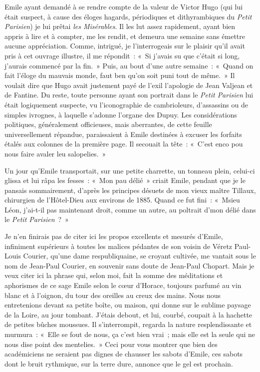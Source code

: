 \documentclass[french,twoside]{book} %
\begin{document}
Emile ayant demandé à se rendre compte de la valeur de Victor Hugo (qui lui était suspect, à cause des éloges hagards, périodiques et dithyrambiques du {\itshape Petit Parisien}) je lui prêtai {\itshape les Misérables}. Il les lut assez rapidement, ayant bien appris à lire et à compter, me les rendit, et demeura une semaine sans émettre aucune appréciation. Comme, intrigué, je l’interrogeais sur le plaisir qu’il avait pris à cet ouvrage illustre, il me répondit : « Si j’avais su que c’était si long, j’aurais commencé par la fin. » Puis, au bout d’une autre semaine : « Quand on fait l’éloge du mauvais monde, faut ben qu’on soit puni tout de même. » Il voulait dire que Hugo avait justement payé de l’exil l’apologie de Jean Valjean et de Fantine. Du reste, toute personne ayant son portrait dans le {\itshape Petit Parisien} lui était logiquement suspecte, vu l’iconographie de cambrioleurs, d’assassins ou de simples ivrognes, à laquelle s’adonne l’organe des Dupuy. Les considérations politiques, généralement officieuses, mais aberrantes, de cette feuille universellement répandue, paraissaient à Emile destinées à excuser les forfaits étalés aux colonnes de la première page. Il secouait la tête : « C’est enco pou nous faire avaler leu salopelies. »\par
Un jour qu’Emile transportait, sur une petite charrette, un tonneau plein, celui-ci glissa et lui râpa les fesses : « Mon pau délié » criait Emile, pendant que je le pansais sommairement, d’après les principes désuets de mon vieux maître Tillaux, chirurgien de l’Hôtel-Dieu aux environs de 1885. Quand ce fut fini : « Msieu Léon, j’ai-t-il pas maintenant droit, comme un autre, au poltrait d’mon délié dans le {\itshape Petit Parisien} ? »\par
Je n’en finirais pas de citer ici les propos excellents et mesurés d’Emile, infiniment supérieurs à toutes les malices pédantes de son voisin de Véretz Paul-Louis Courier, qu’une dame respubliquaine, se croyant cultivée, me vantait sous le nom de Jean-Paul Courier, en souvenir sans doute de Jean-Paul Chopart. Mais je veux citer ici la phrase qui, selon moi, fait la somme des méditations et aphorismes de ce sage Emile selon le cœur d’Horace, toujours parfumé au vin blanc et à l’oignon, du tour des oreilles au creux des mains. Nous nous entretenions devant sa petite boîte, ou maison, qui donne sur le sublime paysage de la Loire, au jour tombant. J’étais debout, et lui, courbé, coupait à la hachette de petites bûches moussues. Il s’interrompit, regarda la nature resplendissante et murmura : « Elle se fout de nous, ça c’est bien vrai ; mais elle est la seule qui ne nous dise point des mentelies. » Ceci pour vous montrer que bien des académiciens ne seraient pas dignes de chausser les sabots d’Emile, ces sabots dont le bruit rythmique, sur la terre dure, annonce que le gel est prochain.\par
\end{document}
